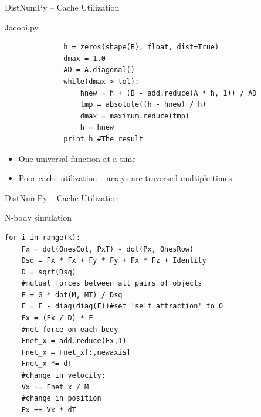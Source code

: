 \documentclass{beamer}
\begin{document}
\begin{frame}[fragile]{DistNumPy -- Cache Utilization}
\begin{center}
Jacobi.py
\end{center}
\begin{scriptsize}
\begin{verbatim}
              h = zeros(shape(B), float, dist=True)
              dmax = 1.0
              AD = A.diagonal()
              while(dmax > tol):
                  hnew = h + (B - add.reduce(A * h, 1)) / AD
                  tmp = absolute((h - hnew) / h)
                  dmax = maximum.reduce(tmp)
                  h = hnew
              print h #The result
\end{verbatim}
\end{scriptsize}

\begin{itemize}
  \item One universal function at a time
  \item Poor cache utilization -- arrays are traversed multiple times
\end{itemize}
\end{frame}


\begin{frame}[fragile]{DistNumPy -- Cache Utilization}
\begin{center}
N-body simulation
\end{center}
\begin{scriptsize}
\begin{verbatim}
for i in range(k):
    Fx = dot(OnesCol, PxT) - dot(Px, OnesRow)
    Dsq = Fx * Fx + Fy * Fy + Fx * Fz + Identity
    D = sqrt(Dsq)
    #mutual forces between all pairs of objects
    F = G * dot(M, MT) / Dsq   
    F = F - diag(diag(F))#set 'self attraction' to 0
    Fx = (Fx / D) * F   
    #net force on each body
    Fnet_x = add.reduce(Fx,1)
    Fnet_x = Fnet_x[:,newaxis]
    Fnet_x *= dT
    #change in velocity:
    Vx += Fnet_x / M
    #change in position
    Px += Vx * dT
\end{verbatim}
\end{scriptsize}
\end{frame}

\end{document}
